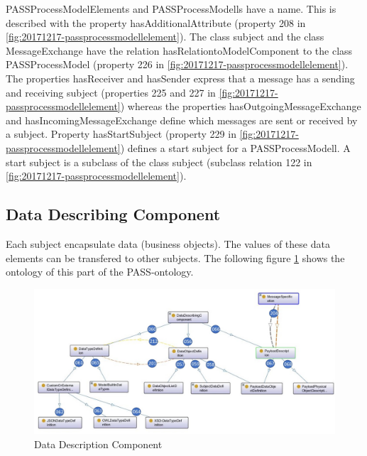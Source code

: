 PASSProcessModelElements and PASSProcessModells have a name. This is described with the property hasAdditionalAttribute (property 208 in \ref{fig:20171217-passprocessmodellelement}). The class subject and the class MessageExchange have the relation hasRelationtoModelComponent to the class PASSProcessModel (property 226 in \ref{fig:20171217-passprocessmodellelement}). The properties hasReceiver and hasSender express that a message has a sending and receiving subject (properties 225 and 227 in \ref{fig:20171217-passprocessmodellelement}) whereas the properties hasOutgoingMessageExchange and hasIncomingMessageExchange define which messages are sent or received by a subject. Property hasStartSubject (property 229 in \ref{fig:20171217-passprocessmodellelement}) defines a start subject for a PASSProcessModell. A start subject is a subclass of the class subject (subclass relation 122 in \ref{fig:20171217-passprocessmodellelement}).


\subsection{Data Describing Component}
Each subject encapsulate data (business objects). The values of these data elements can be transfered to other subjects. The following figure \ref{fig:20181218-data} shows the ontology of this part of the PASS-ontology.

\begin{figure}[ph]
	\centering
	\includegraphics[width=0.9\linewidth]{20181026-Ontologie-Bilder/Grafiken-Ontologie/SUbject-Interaction/20181218-Data}
	\caption[Data Description Component]{Data Description Component}
	\label{fig:20181218-data}
\end{figure}

